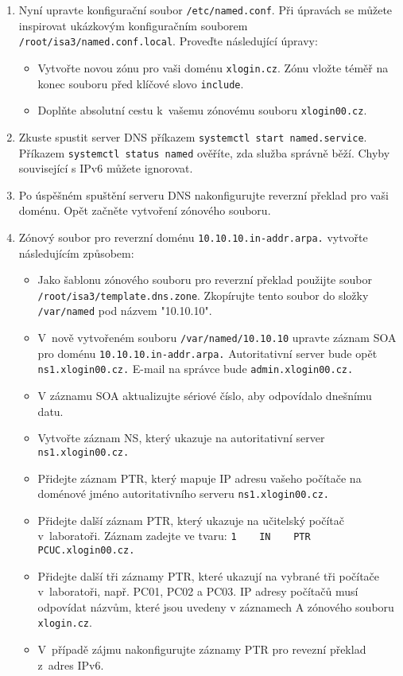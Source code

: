 \begin{enumerate}
  \item Nyní upravte konfigurační soubor {\tt /etc/named.conf}. Při úpravách se můžete inspirovat ukázkovým konfiguračním souborem {\tt /root/isa3/named.conf.local}. Proveďte následující úpravy:
    \begin{itemize}
      \item Vytvořte novou zónu pro vaši doménu {\tt xlogin.cz}. Zónu vložte téměř na konec souboru před klíčové slovo {\tt include}.
      \item Doplňte absolutní cestu k~vašemu zónovému souboru \texttt{xlogin00.cz}.
    \end{itemize}
  \item Zkuste spustit server DNS příkazem {\tt systemctl start named.service}. Příkazem {\tt systemctl status named} ověříte, zda služba správně běží. Chyby související s IPv6 můžete ignorovat.
  
  \item Po úspěšném spuštění serveru DNS nakonfigurujte reverzní překlad pro vaši doménu. Opět začněte vytvoření zónového souboru. 
    
  \item Zónový soubor pro reverzní doménu {\tt 10.10.10.in-addr.arpa.} vytvořte následujícím způsobem:
    \begin{itemize}
      \item Jako šablonu zónového souboru pro reverzní překlad použijte soubor {\tt /root/isa3/temp\-late.dns.zone}.
            Zkopírujte tento soubor do složky {\tt /var/named} pod názvem "10.10.10".
      \item V~nově vytvořeném souboru {\tt /var/named/10.10.10} upravte záznam SOA pro doménu {\tt 10.10.10.in-addr.arpa.} Autoritativní server bude opět {\tt ns1.xlogin00.cz.} E-mail na správce bude {\tt admin.xlogin00.cz.}
      \item V záznamu SOA aktualizujte sériové číslo, aby odpovídalo dnešnímu datu.
      \item Vytvořte záznam NS, který ukazuje na autoritativní server {\tt ns1.xlogin00.cz.}
      \item Přidejte záznam PTR, který mapuje IP adresu vašeho počítače na doménové jméno autoritativního serveru {\tt ns1.xlogin00.cz.}
      \item Přidejte další záznam PTR, který ukazuje na učitelský počítač v~laboratoři. Záznam zadejte ve tvaru:
            \verb|1    IN    PTR    PCUC.xlogin00.cz.|
      \item Přidejte další tři záznamy PTR, které ukazují na vybrané tři počítače v~laboratoři, např. PC01, PC02 a PC03. IP adresy počítačů musí odpovídat názvům, které jsou uvedeny v záznamech A zónového souboru {\tt xlogin.cz}.
      \item V~případě zájmu nakonfigurujte záznamy PTR pro revezní překlad z~adres IPv6.
    \end{itemize} 


\end{enumerate}
